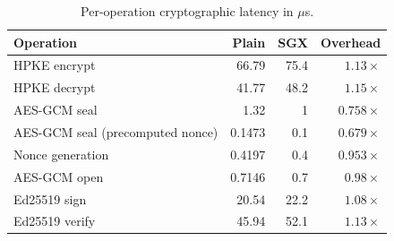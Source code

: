 \begin{table}[H]
\centering
\begin{tabular}{lrrr}
\toprule
Operation & Plain & SGX & Overhead \\
\midrule
HPKE encrypt & 66.79 & 75.4 & $1.13\times$ \\
HPKE decrypt & 41.77 & 48.2 & $1.15\times$ \\
AES-GCM seal & 1.32 & 1 & $0.758\times$ \\
\quad AES-GCM seal (precomputed nonce) & 0.1473 & 0.1 & $0.679\times$ \\
\quad Nonce generation & 0.4197 & 0.4 & $0.953\times$ \\
AES-GCM open & 0.7146 & 0.7 & $0.98\times$ \\
Ed25519 sign & 20.54 & 22.2 & $1.08\times$ \\
Ed25519 verify & 45.94 & 52.1 & $1.13\times$ \\
\bottomrule
\end{tabular}
\caption{Per-operation cryptographic latency in ${}\mu$s.}
\label{tab:reproduction-table4}
\end{table}
